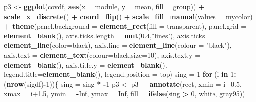 \documentclass[
]{article}
\newenvironment{Shaded}{\begin{snugshade}}{\end{snugshade}}
\newcommand{\AttributeTok}[1]{\textcolor[rgb]{0.13,0.29,0.53}{#1}}
\newcommand{\ConstantTok}[1]{\textcolor[rgb]{0.56,0.35,0.01}{#1}}
\newcommand{\ControlFlowTok}[1]{\textcolor[rgb]{0.13,0.29,0.53}{\textbf{#1}}}
\newcommand{\DecValTok}[1]{\textcolor[rgb]{0.00,0.00,0.81}{#1}}
\newcommand{\FloatTok}[1]{\textcolor[rgb]{0.00,0.00,0.81}{#1}}
\newcommand{\FunctionTok}[1]{\textcolor[rgb]{0.13,0.29,0.53}{\textbf{#1}}}
\newcommand{\NormalTok}[1]{#1}
\newcommand{\OtherTok}[1]{\textcolor[rgb]{0.56,0.35,0.01}{#1}}
\newcommand{\SpecialCharTok}[1]{\textcolor[rgb]{0.81,0.36,0.00}{\textbf{#1}}}
\newcommand{\StringTok}[1]{\textcolor[rgb]{0.31,0.60,0.02}{#1}}
\begin{document}
\begin{Shaded}
\begin{Highlighting}[]
\NormalTok{p3 }\OtherTok{\textless{}{-}} \FunctionTok{ggplot}\NormalTok{(covdf, }\FunctionTok{aes}\NormalTok{(}\AttributeTok{x =}\NormalTok{ module, }\AttributeTok{y =}\NormalTok{ mean, }\AttributeTok{fill =}\NormalTok{ group)) }\SpecialCharTok{+} 
      \FunctionTok{scale\_x\_discrete}\NormalTok{() }\SpecialCharTok{+} \FunctionTok{coord\_flip}\NormalTok{() }\SpecialCharTok{+} \FunctionTok{scale\_fill\_manual}\NormalTok{(}\AttributeTok{values =}\NormalTok{ mycolor) }\SpecialCharTok{+}
      \FunctionTok{theme}\NormalTok{(}\AttributeTok{panel.background =} \FunctionTok{element\_rect}\NormalTok{(}\AttributeTok{fill =} \StringTok{\textquotesingle{}transparent\textquotesingle{}}\NormalTok{),}
        \AttributeTok{panel.grid =} \FunctionTok{element\_blank}\NormalTok{(),}
        \AttributeTok{axis.ticks.length =} \FunctionTok{unit}\NormalTok{(}\FloatTok{0.4}\NormalTok{,}\StringTok{"lines"}\NormalTok{),}
        \AttributeTok{axis.ticks =} \FunctionTok{element\_line}\NormalTok{(}\AttributeTok{color=}\StringTok{\textquotesingle{}black\textquotesingle{}}\NormalTok{),}
        \AttributeTok{axis.line =} \FunctionTok{element\_line}\NormalTok{(}\AttributeTok{colour =} \StringTok{"black"}\NormalTok{),}
        \AttributeTok{axis.text =} \FunctionTok{element\_text}\NormalTok{(}\AttributeTok{colour=}\StringTok{\textquotesingle{}black\textquotesingle{}}\NormalTok{,}\AttributeTok{size=}\DecValTok{10}\NormalTok{),}
        \AttributeTok{axis.text.y =} \FunctionTok{element\_blank}\NormalTok{(),}
        \AttributeTok{axis.title.y =} \FunctionTok{element\_blank}\NormalTok{(),}
        \AttributeTok{legend.title=}\FunctionTok{element\_blank}\NormalTok{(),}
        \AttributeTok{legend.position =} \StringTok{\textquotesingle{}top\textquotesingle{}}\NormalTok{)}
\NormalTok{sing }\OtherTok{=} \DecValTok{1}
\ControlFlowTok{for}\NormalTok{ (i }\ControlFlowTok{in} \DecValTok{1}\SpecialCharTok{:}\NormalTok{(}\FunctionTok{nrow}\NormalTok{(sigdf)}\SpecialCharTok{{-}}\DecValTok{1}\NormalTok{))\{}
\NormalTok{  sing }\OtherTok{=}\NormalTok{ sing }\SpecialCharTok{*} \SpecialCharTok{{-}}\DecValTok{1}
\NormalTok{  p3 }\OtherTok{\textless{}{-}}\NormalTok{ p3 }\SpecialCharTok{+} \FunctionTok{annotate}\NormalTok{(}\StringTok{\textquotesingle{}rect\textquotesingle{}}\NormalTok{, }\AttributeTok{xmin =}\NormalTok{ i}\FloatTok{+0.5}\NormalTok{, }\AttributeTok{xmax =}\NormalTok{ i}\FloatTok{+1.5}\NormalTok{, }\AttributeTok{ymin =} \SpecialCharTok{{-}}\ConstantTok{Inf}\NormalTok{, }\AttributeTok{ymax =} \ConstantTok{Inf}\NormalTok{,}
                     \AttributeTok{fill =} \FunctionTok{ifelse}\NormalTok{(sing }\SpecialCharTok{\textgreater{}} \DecValTok{0}\NormalTok{, }\StringTok{\textquotesingle{}white\textquotesingle{}}\NormalTok{, }\StringTok{\textquotesingle{}gray95\textquotesingle{}}\NormalTok{))}

\end{Highlighting}
\end{Shaded}
\end{document}
